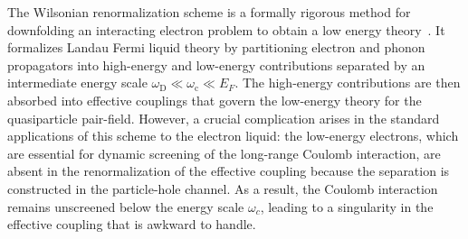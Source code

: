\documentclass[%
 reprint,
superscriptaddress,
 amsmath,amssymb,
 aps,
prx,
]{revtex4-2}
\newcommand{\txc}{\text{c}}
\newcommand{\txD}{\text{D}}
\newcommand{\txF}{\text{F}}
\begin{document}
The  Wilsonian renormalization scheme is a formally rigorous method for downfolding an interacting electron problem to obtain a low energy theory~\cite{RAINER1986371,Shankar94}. It formalizes Landau Fermi liquid theory by partitioning electron and phonon propagators into high-energy and low-energy contributions separated by an intermediate energy scale $\omega_\txD \ll \omega_\txc \ll E_F$.  
The high-energy contributions are then absorbed into effective couplings that govern the low-energy theory for the quasiparticle pair-field. However, a crucial complication arises in the standard applications of this scheme to the electron liquid:  the low-energy electrons, which are essential for dynamic screening of the long-range Coulomb interaction, are absent in the renormalization of the effective coupling because the separation is constructed in the particle-hole channel.  As a result, the Coulomb interaction remains unscreened below the energy scale $\omega_c$, leading to a singularity in the effective coupling that is awkward to handle. 
\end{document}
